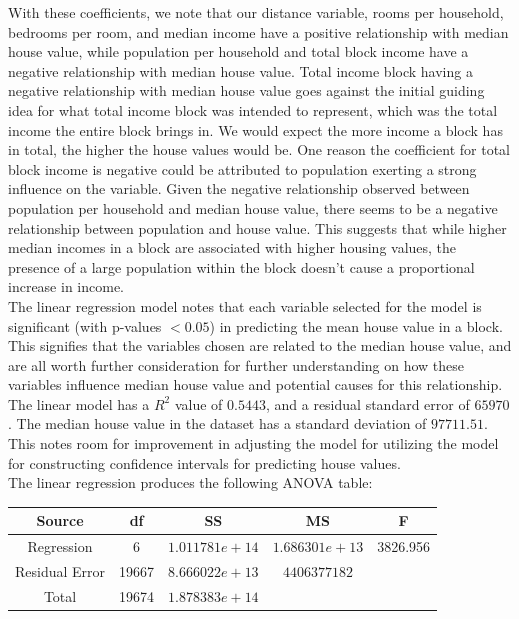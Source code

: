 \documentclass[10pt]{article}
\begin{document}
\hspace*{2em} With these coefficients, we note that our distance variable, rooms per household, bedrooms per room, 
and median income have a positive relationship with median house value, 
while population per household and total block income have a negative relationship with median house value. Total income block 
having a negative relationship with median house value goes against the initial guiding idea for what total income block was intended to represent,
which was the total income the entire block brings in. We would expect the more income a block has in total, the higher the house values would be.
One reason the coefficient for total block income is negative could be attributed to population exerting a strong influence on the variable.
Given the negative relationship observed between population per household and median house value, there seems to be a negative relationship between
population and house value. This suggests that while higher median incomes in a block are associated with higher housing values, the presence
of a large population within the block doesn't cause a proportional increase in income.\\
\hspace*{2em} The linear regression model notes that each variable selected for the model is significant (with p-values $< 0.05$) in predicting
the mean house value in a block. This signifies that the variables chosen are related to the median house value, and are all worth further consideration
for further understanding on how these variables influence median house value and potential causes for this relationship.\\ 
\hspace*{2em} The linear model has a $R^2$ value of $0.5443$, and a residual standard error of $65970$. The median house value in the dataset
has a standard deviation of $97711.51$. This notes room for improvement in adjusting the model for utilizing the model for constructing
confidence intervals for predicting house values.\\
\hspace*{2em} The linear regression produces the following ANOVA table:\\
\begin{center}
\begin{adjustbox}{scale=1}
    \begin{tabular}{|c|c|c|c|c|}
        \hline
        Source & df & SS & MS & F \\
        \hline
        Regression & 6  & $1.011781e+14$ & $1.686301e+13$ & 3826.956\\
        \hline
        Residual Error & 19667 & $8.666022e+13$ & $4406377182$ & \\
        \hline
        Total & 19674 & $1.878383e+14$ &  & \\
        \hline
    \end{tabular}
\end{adjustbox}
\end{center}
\end{document}

